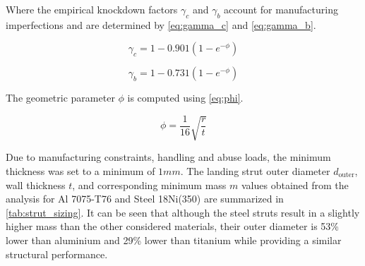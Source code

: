 Where the empirical knockdown factors  $\gamma_c$ and $\gamma_b$ account for manufacturing imperfections and are determined by \autoref{eq:gamma_c} and \autoref{eq:gamma_b}.

\noindent
\begin{minipage}{0.48\textwidth}
\begin{equation}
\gamma_c = 1 - 0.901(1 - e^{-\phi})
\label{eq:gamma_c}
\end{equation}
\end{minipage}
\hfill
\begin{minipage}{0.48\textwidth}
\begin{equation}
\gamma_b = 1 - 0.731(1 - e^{-\phi})
\label{eq:gamma_b}
\end{equation}
\end{minipage}

The geometric parameter $\phi$ is computed using \autoref{eq:phi}.

\begin{equation}
\phi = \frac{1}{16}\sqrt{\frac{r}{t}}
\label{eq:phi}
\end{equation}

Due to manufacturing constraints, handling and abuse loads, the minimum thickness was set to a minimum of $1 mm$. The landing strut outer diameter $d_\text{outer}$, wall thickness $t$, and corresponding minimum mass $m$ values obtained from the analysis for Al 7075-T76 and Steel 18Ni(350) are summarized in \autoref{tab:strut_sizing}. It can be seen that although the steel struts result in a slightly higher mass than the other considered materials, their outer diameter is 53\% lower than aluminium and 29\% lower than titanium while providing a similar structural performance.

